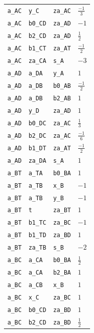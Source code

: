 \begin{longtable}{llll}
\texttt{a\_AC} & \texttt{y\_C} & \texttt{za\_AC} & $\frac{-1}{3}$\\
\texttt{a\_AC} & \texttt{b0\_CD} & \texttt{za\_AD} & $-1$\\
\texttt{a\_AC} & \texttt{b2\_CD} & \texttt{za\_AD} & $\frac{1}{2}$\\
\texttt{a\_AC} & \texttt{b1\_CT} & \texttt{za\_AT} & $\frac{-1}{2}$\\
\texttt{a\_AC} & \texttt{za\_CA} & \texttt{s\_A} & $-3$\\
\texttt{a\_AD} & \texttt{a\_DA} & \texttt{y\_A} & $1$\\
\texttt{a\_AD} & \texttt{a\_DB} & \texttt{b0\_AB} & $\frac{-1}{2}$\\
\texttt{a\_AD} & \texttt{a\_DB} & \texttt{b2\_AB} & $1$\\
\texttt{a\_AD} & \texttt{y\_D} & \texttt{za\_AD} & $1$\\
\texttt{a\_AD} & \texttt{b0\_DC} & \texttt{za\_AC} & $\frac{1}{3}$\\
\texttt{a\_AD} & \texttt{b2\_DC} & \texttt{za\_AC} & $\frac{-1}{6}$\\
\texttt{a\_AD} & \texttt{b1\_DT} & \texttt{za\_AT} & $\frac{-1}{2}$\\
\texttt{a\_AD} & \texttt{za\_DA} & \texttt{s\_A} & $1$\\
\texttt{a\_BT} & \texttt{a\_TA} & \texttt{b0\_BA} & $1$\\
\texttt{a\_BT} & \texttt{a\_TB} & \texttt{x\_B} & $-1$\\
\texttt{a\_BT} & \texttt{a\_TB} & \texttt{y\_B} & $-1$\\
\texttt{a\_BT} & \texttt{t} & \texttt{za\_BT} & $1$\\
\texttt{a\_BT} & \texttt{b1\_TC} & \texttt{za\_BC} & $-1$\\
\texttt{a\_BT} & \texttt{b1\_TD} & \texttt{za\_BD} & $1$\\
\texttt{a\_BT} & \texttt{za\_TB} & \texttt{s\_B} & $-2$\\
\texttt{a\_BC} & \texttt{a\_CA} & \texttt{b0\_BA} & $\frac{1}{2}$\\
\texttt{a\_BC} & \texttt{a\_CA} & \texttt{b2\_BA} & $1$\\
\texttt{a\_BC} & \texttt{a\_CB} & \texttt{x\_B} & $1$\\
\texttt{a\_BC} & \texttt{x\_C} & \texttt{za\_BC} & $1$\\
\texttt{a\_BC} & \texttt{b0\_CD} & \texttt{za\_BD} & $1$\\
\texttt{a\_BC} & \texttt{b2\_CD} & \texttt{za\_BD} & $\frac{1}{2}$\\

\end{longtable}
